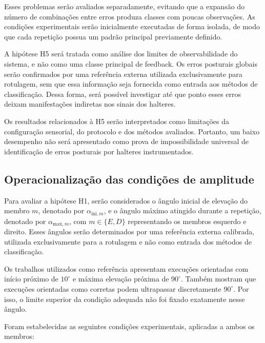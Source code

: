 Esses problemas serão avaliados separadamente, evitando que a expansão
do número de combinações entre erros produza classes com poucas
observações. As condições experimentais serão inicialmente executadas de
forma isolada, de modo que cada repetição possua um padrão principal
previamente definido.

A hipótese H5 será tratada como análise dos limites de observabilidade do
sistema, e não como uma classe principal de feedback. Os erros posturais
globais serão confirmados por uma referência externa utilizada
exclusivamente para rotulagem, sem que essa informação seja fornecida
como entrada aos métodos de classificação. Dessa forma, será possível
investigar até que ponto esses erros deixam manifestações indiretas nos
sinais dos halteres.

Os resultados relacionados à H5 serão interpretados como limitações da
configuração sensorial, do protocolo e dos métodos avaliados. Portanto,
um baixo desempenho não será apresentado como prova de impossibilidade
universal de identificação de erros posturais por halteres
instrumentados.

\subsection{Operacionalização das condições de amplitude}
\label{subsec:operacionalizacao-amplitude}

Para avaliar a hipótese H1, serão considerados o ângulo inicial de
elevação do membro $m$, denotado por $\alpha_{\mathrm{ini},m}$, e o
ângulo máximo atingido durante a repetição, denotado por
$\alpha_{\mathrm{max},m}$, com $m \in \{E,D\}$ representando os membros
esquerdo e direito. Esses ângulos serão determinados por uma referência
externa calibrada, utilizada exclusivamente para a rotulagem e não como
entrada dos métodos de classificação.

Os trabalhos utilizados como referência apresentam execuções orientadas
com início próximo de $10^\circ$ e máxima elevação próxima de
$90^\circ$. Também mostram que execuções orientadas como corretas podem
ultrapassar discretamente $90^\circ$. Por isso, o limite superior da
condição adequada não foi fixado exatamente nesse ângulo.

Foram estabelecidas as seguintes condições experimentais, aplicadas a
ambos os membros:

